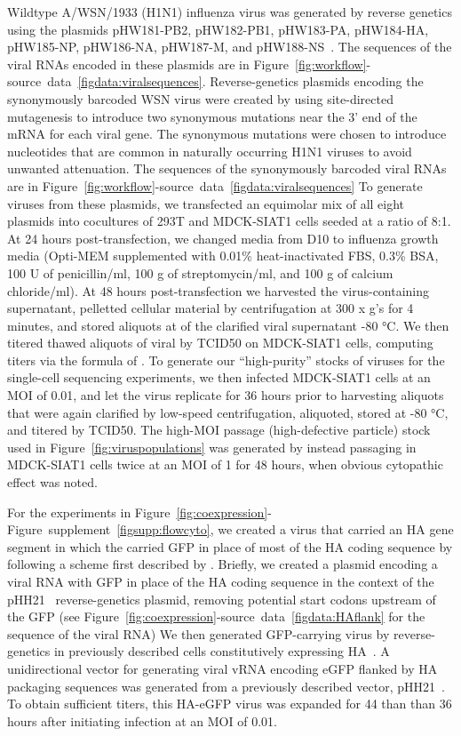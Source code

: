 \documentclass[9pt,lineno]{elife}
\begin{document}
Wildtype A/WSN/1933 (H1N1) influenza virus was generated by reverse genetics using the plasmids pHW181-PB2, pHW182-PB1, pHW183-PA, pHW184-HA, pHW185-NP, pHW186-NA, pHW187-M, and pHW188-NS~\citep{hoffmann2000dna}.
The sequences of the viral RNAs encoded in these plasmids are in Figure~\ref{fig:workflow}-source~data~\ref{figdata:viralsequences}.
Reverse-genetics plasmids encoding the synonymously barcoded WSN virus were created by using site-directed mutagenesis to introduce two synonymous mutations near the 3' end of the mRNA for each viral gene.
The synonymous mutations were chosen to introduce nucleotides that are common in naturally occurring H1N1 viruses to avoid unwanted attenuation.
The sequences of the synonymously barcoded viral RNAs are in Figure~\ref{fig:workflow}-source~data~\ref{figdata:viralsequences}
To generate viruses from these plasmids, we transfected an equimolar mix of all eight plasmids into cocultures of 293T and MDCK-SIAT1 cells seeded at a ratio of 8:1. 
At 24 hours post-transfection, we changed media from D10 to influenza growth media (Opti-MEM supplemented with 0.01\% heat-inactivated FBS, 0.3\% BSA, 100 U of penicillin/ml, 100  \si{\micro}g of streptomycin/ml, and 100 \si{\micro}g of calcium chloride/ml).
At 48 hours post-transfection we harvested the virus-containing supernatant, pelletted cellular material by centrifugation at 300 x g's for 4 minutes, and stored aliquots at of the clarified viral supernatant -80 \si{\degreeCelsius }. 
We then titered thawed aliquots of viral by TCID50 on MDCK-SIAT1 cells, computing titers via the formula of \citet{reed1938simple}.
To generate our ``high-purity'' stocks of viruses for the single-cell sequencing experiments, we then infected MDCK-SIAT1 cells at an MOI of 0.01, and let the virus replicate for 36 hours prior to harvesting aliquots that were again clarified by low-speed centrifugation, aliquoted, stored at -80  \si{\degreeCelsius }, and titered by TCID50.
The high-MOI passage (high-defective particle) stock used in Figure~\ref{fig:viruspopulations} was generated by instead passaging in MDCK-SIAT1 cells twice at an MOI of 1 for 48 hours, when obvious cytopathic effect was noted.

For the experiments in Figure~\ref{fig:coexpression}-Figure~supplement~\ref{figsupp:flowcyto}, we created a virus that carried an HA gene segment in which the carried GFP in place of most of the HA coding sequence by following a scheme first described by \citet{marsh2007specific}.
Briefly, we created a plasmid encoding a viral RNA with GFP in place of the HA coding sequence in the context of the pHH21~\citep{Neumann:1999ws} reverse-genetics plasmid, removing potential start codons upstream of the GFP (see Figure~\ref{fig:coexpression}-source~data~\ref{figdata:HAflank} for the sequence of the viral RNA)
We then generated GFP-carrying virus by reverse-genetics in previously described cells constitutively expressing HA~\citep{Doud:2016gm}.
A unidirectional vector for generating viral vRNA encoding eGFP flanked by HA packaging sequences was generated from a previously described vector, pHH21~\citep{Neumann:1999ws}. 
To obtain sufficient titers, this HA-eGFP virus was expanded for 44 than than 36 hours after initiating infection at an MOI of 0.01.
\end{document}

